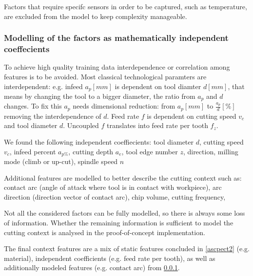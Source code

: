 \documentclass[5p,times,procedia]{elsarticle}
\begin{document}
	Factors that require specifc sensors in order to be captured, such as temperature, are excluded from the model to keep complexity manageable.
	
\subsubsection{Modelling of the factors as mathematically independent coeffecients}\label{ascpect3}
	To achieve high quality training data interdependence or correlation among features is to be avoided.
	Most classical technological paramters are interdependent: e.g. infeed $a_p [mm]$ is dependent on tool diamter $d [mm]$, that means by changing the tool to a bigger diameter, the ratio from $a_p$ and $d$ changes. To fix this $a_p$ needs dimensional reduction: from $a_p [mm]$ to $\frac{a_p}{d} [\%]$ removing the interdependence of $d$. Feed rate $f$ is dependent on cutting speed $v_c$ and tool diameter $d$. Uncoupled $f$ translates into feed rate per tooth $f_z$.
	
	We found the following independent coeffiecients:
	tool diameter $d$, cutting speed $v_c$, infeed percent $a_{p\%}$, cutting depth $a_e$, tool edge number $z$, direction, milling mode (climb or up-cut), spindle speed $n$
		
	Additional features are modelled to better describe the cutting context such as: contact arc (angle of attack where tool is in contact with workpiece), arc direction (direction vector of contact arc), chip volume, cutting frequency, 
	
	Not all the considered factors can be fully modelled, so there is always some loss of information.
	Whether the remaining information is sufficient to model the cutting context is analysed in the proof-of-concept implementation.



The final context features are a mix of static features concluded in \ref{ascpect2}  (e.g. material), independent coefficients (e.g. feed rate per tooth), as well as additionally modeled features (e.g. contact arc) from \ref{ascpect3}.
\end{document}

